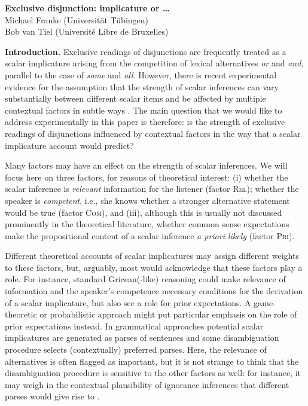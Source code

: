 \documentclass[12pt]{article}
\newcommand{\acro}[1]{\textsc{#1}\xspace}
\newcommand{\rel}{\acro{Rel}}
\newcommand{\com}{\acro{Com}}
\newcommand{\pri}{\acro{Pri}}
\begin{document}
\pagestyle{empty}

\noindent \large\textbf{Exclusive disjunction: implicature or \dots} \\[3pt]\normalsize
Michael Franke (Universit\"{a}t T\"{u}bingen) \\[0pt] Bob van Tiel (Universit\'{e} Libre de Bruxelles) \\

\medskip

\noindent \textbf{Introduction.} Exclusive readings of disjunctions are frequently treated as a scalar implicature
arising from the competition of lexical alternatives \emph{or} and \emph{and}, parallel to the
case of \emph{some} and \emph{all}. However, there is recent experimental evidence for the
assumption that the strength of scalar inferences can vary substantially between different
scalar items \citep[e.g.][]{Tielvan-TielMiltenburgvan-Miltenburg2014:Scalar-Diversit} and be
affected by multiple contextual factors in subtle ways
\citep[e.g.][]{Degen2015:Investigating-t}. The main question that we would like to address
experimentally in this paper is therefore: is the strength of exclusive readings of
disjunctions influenced by contextual factors in the way that a scalar implicature account
would predict?

Many factors may have an effect on the strength of scalar inferences. We will focus here on
three factors, for reasons of theoretical interest: (i) whether the scalar inference is
\emph{relevant} information for the listener (factor \rel); whether the speaker is
\emph{competent}, i.e., she knows whether a stronger alternative statement would be true
(factor \com), and (iii), although this is usually not discussed prominently in the theoretical
literature, whether common sense expectations make the propositional content of a scalar
inference \emph{a priori likely} (factor \pri).

Different theoretical accounts of scalar implicatures may assign different weights to these
factors, but, arguably, most would acknowledge that these factors play a role. For instance,
standard Gricean(-like) reasoning could make relevance of information and the speaker's
competence necessary conditions for the derivation of a scalar implicature, but also see a role
for prior expectations. A game-theoretic or probabilistic approach might put particular
emphasis on the role of prior expectations instead. In grammatical approaches potential scalar
implicatures are generated as parses of sentences and some disambiguation procedure selects
(contextually) preferred parses. Here, the relevance of alternatives is often flagged as
important, but it is not strange to think that the disambiguation procedure is sensitive to the
other factors as well: for instance, it may weigh in the contextual plausibility of ignorance
inferences that different parses would give rise to \citep[e.g.][]{Fox2007:Free-Choice-and}.
\end{document}
